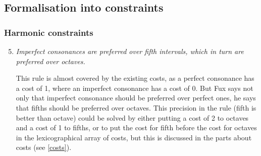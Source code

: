 \subsection{Formalisation into constraints}\label{formalisation-c-4th}
\subsubsection{Harmonic constraints}
\begin{enumerate}[wide, label=\bfseries 4.H\arabic*]
    \setcounter{enumi}{4}
    \item \textit{Imperfect consonances are preferred over fifth intervals, which in turn are preferred over octaves.} \label{constraint:prefer-fifths-over-octaves}   

    This rule is almost covered by the existing costs, as a perfect consonance has a cost of 1, where an imperfect consonance has a cost of 0. But Fux says not only that imperfect consonance should be preferred over perfect ones, he says that fifths should be preferred over octaves. This precision in the rule (fifth is better than octave) could be solved by either putting a cost of 2 to octaves and a cost of 1 to fifths, or to put the cost for fifth before the cost for octaves in the lexicographical array of costs, but this is discussed in the parts about costs (see \ref{costs}).

\end{enumerate}

